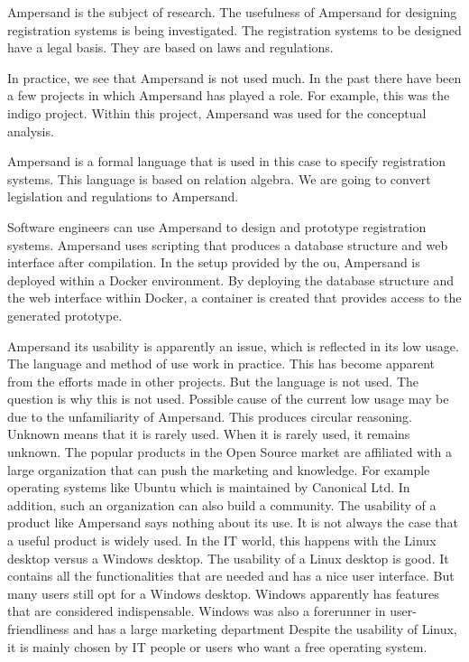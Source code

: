 Ampersand is the subject of research.
The usefulness of Ampersand for designing registration systems is being investigated.
The registration systems to be designed have a legal basis.
They are based on laws and regulations.

In practice, we see that Ampersand is not used much.
In the past there have been a few projects in which Ampersand has played a role.
For example, this was the \acrlong{indigo} project.
Within this project, Ampersand was used for the conceptual analysis.

Ampersand is a formal language that is used in this case to specify registration systems.
This language is based on relation algebra.
We are going to convert legislation and regulations to Ampersand.

Software engineers can use Ampersand to design and prototype registration systems.
Ampersand uses scripting that produces a database structure and web interface after compilation.
In the setup provided by the \acrlong{ou}, Ampersand is deployed within a Docker environment.
By deploying the database structure and the web interface within Docker, a container is created that provides access to the generated prototype.

Ampersand its usability is apparently an issue, which is reflected in its low usage.
The language and method of use work in practice. This has become apparent from the efforts made in other projects.
But the language is not used.
The question is why this is not used.
Possible cause of the current low usage may be due to the unfamiliarity of Ampersand.
This produces circular reasoning.
Unknown means that it is rarely used.
When it is rarely used, it remains unknown.
The popular products in the Open Source market are affiliated with a large organization that can push the marketing and knowledge. 
For example operating systems like Ubuntu which is maintained by Canonical Ltd.
In addition, such an organization can also build a community.
The usability of a product like Ampersand says nothing about its use.
It is not always the case that a useful product is widely used.
In the IT world, this happens with the Linux desktop versus a Windows desktop.
The usability of a Linux desktop is good.
It contains all the functionalities that are needed and has a nice user interface.
But many users still opt for a Windows desktop.
Windows apparently has features that are considered indispensable.
Windows was also a forerunner in user-friendliness and has a large marketing department
Despite the usability of Linux, it is mainly chosen by IT people or users who want a free operating system.


